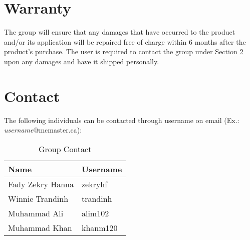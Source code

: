 \documentclass[12pt]{article}
\begin{document}

\section{Warranty} \label{sec:Warranty}

The group will ensure that any damages that have occurred to the product and/or its application will be repaired free of charge within 6 months after the product's purchase. The user is required to contact the group under Section \ref{sec:Contact} upon any damages and have it shipped personally.

\section{Contact} \label{sec:Contact}

The following individuals can be contacted through username on email (Ex.: \textit{username}@mcmaster.ca):

\begin{longtable}{| l | l |}
\caption {Group Contact}
\label{tab:Contact} \\
\hline
\textbf{Name} & \textbf{Username} \\
\hline
\endhead
Fady Zekry Hanna & zekryhf \\
\hline
Winnie Trandinh & trandinh \\
\hline
Muhammad Ali & alim102 \\
\hline
Muhammad Khan & khanm120 \\
\hline
\end{longtable}
\end{document}
